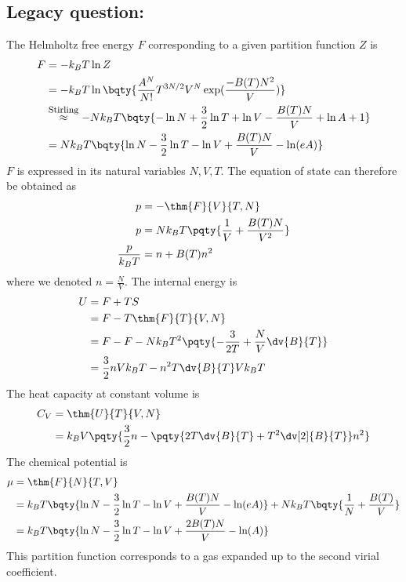 \documentclass[12pt]{article}
\newcommand{\upup}[2]{\stackrel{\mbox{\normalfont\footnotesize{#1}}}{#2}}
\begin{document}
    \subsection*{Legacy question:} The Helmholtz free energy \(F\) corresponding to a given partition function \(Z\) is \begin{align*}
        F &= - k_BT \ln Z\\
        &=  - k_BT \ln\bqty{\frac{A^N}{N!}T^{3N /2}V^N \exp(\frac{ - B(T)N^2}{V} )}\\
        &\upup{Stirling}{ \approx }  - Nk_BT\bqty{- \ln N + \frac{3}{2} \ln T + \ln V - \frac{B(T )N}{V} + \ln A + 1}\\
        &=  Nk_BT\bqty{\ln N - \frac{3}{2} \ln T - \ln V + \frac{B(T )N}{V} - \ln(eA)}
    \end{align*}
    \(F\) is expressed in its natural variables \(N,V,T\). The equation of state can therefore be obtained as \begin{align*}
        p &= - \thm{F}{V}{T,N}\\
        p &= Nk_BT \pqty{\frac{1}{V} + \frac{B(T)N}{V^2} }\\
        \frac{p}{k_BT} &= n + B(T) n^2
    \end{align*}
    where we denoted \(n = \frac{N}{V}\). The internal energy is \begin{align*}
        U &= F + TS\\
        &= F - T \thm{F}{T}{V,N}\\
        &= F - F - Nk_BT^2\pqty{ - \frac{3}{2T} + \frac{N}{V} \dv{B}{T}}\\
        &= \frac{3}{2} nV k_BT - n^2 T \dv{B}{T}Vk_BT
    \end{align*}
    The heat capacity at constant volume is \begin{align*}
        C_V &= \thm{U}{T}{V,N}\\
        &= k_B V\pqty{\frac{3}{2}n - \pqty{2T \dv{B}{T} + T^2 \dv[2]{B}{T}} n^2}
    \end{align*}
    The chemical potential is \begin{align*}
        \mu &= \thm{F}{N}{T,V}\\
        &= k_BT\bqty{\ln N - \frac{3}{2} \ln T - \ln V + \frac{B(T )N}{V} - \ln(eA)} + Nk_BT\bqty{\frac{1}{N} + \frac{B(T )}{V}}\\
        &= k_BT\bqty{\ln N - \frac{3}{2} \ln T - \ln V + \frac{2B(T )N}{V} - \ln(A)}
    \end{align*}
    This partition function corresponds to a gas expanded up to the second virial coefficient.
\end{document}
